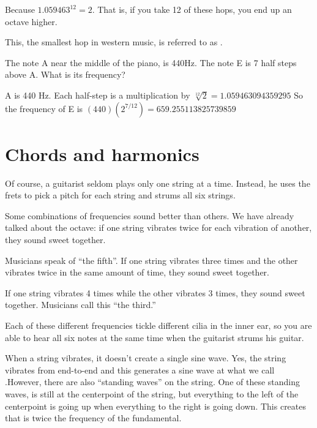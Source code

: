 Because $1.059463^12 = 2$. That is, if you take 12 of these hops, you
end up an octave higher.

This, the smallest hop in western music, is referred to as .

\begin{Exercise}[title={Notes and frequecies}, label=note_to_frequency]

The note A near the middle of the piano, is 440Hz. The note E is 7 half steps above A.  What is its frequency?
 
\end{Exercise}
\begin{Answer}[ref=note_to_frequency]

  A is 440 Hz.  Each half-step is a multiplication by $\sqrt[12]{2} = 1.059463094359295$
  So the frequency of E is $(440)(2^{7/12}) = 659.255113825739859$

\end{Answer}


\section{Chords and harmonics}

Of course, a guitarist seldom plays only one string at a
time. Instead, he uses the frets to pick a pitch for each string and
strums all six strings.

Some combinations of frequencies sound better than others. We have
already talked about the octave: if one string vibrates twice for each
vibration of another, they sound sweet together.

Musicians speak of ``the fifth''.  If one string vibrates three times
and the other vibrates twice in the same amount of time, they sound
sweet together.

If one string vibrates 4 times while the other vibrates 3 times, they
sound sweet together. Musicians call this ``the third.''

Each of these different frequencies tickle different cilia in the
inner ear, so you are able to hear all six notes at the same time when
the guitarist strums his guitar.

When a string vibrates, it doesn't create a single sine wave. Yes, the
string vibrates from end-to-end and this generates a sine wave at what
we call .However, there are also
``standing waves'' on the string. One of these standing waves, is
still at the centerpoint of the string, but everything to the left of
the centerpoint is going up when everything to the right is going
down. This creates  that is twice the frequency
of the fundamental.

